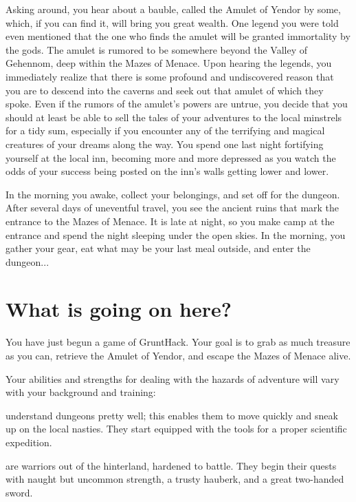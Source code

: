 Asking around, you hear about a bauble, called the Amulet of Yendor by some,
which, if you can find it, will bring you great wealth.  One legend you were
told even mentioned that the one who finds the amulet will be granted
immortality by the gods.  The amulet is rumored to be somewhere beyond the
Valley of Gehennom, deep within the Mazes of Menace.  Upon hearing the
legends, you immediately realize that there is some profound and 
undiscovered reason that you are to descend into the caverns and seek 
out that amulet of which they spoke.  Even if the rumors of the amulet's 
powers are untrue, you decide that you should at least be able to sell the 
tales of your adventures to the local minstrels for a tidy sum, especially 
if you encounter any of the terrifying and magical creatures of 
your dreams along the way.  You spend one last night fortifying yourself 
at the local inn, becoming more and more depressed as you watch the odds 
of your success being posted on the inn's walls getting lower and lower.  


  In the morning you awake, collect your belongings, and 
set off for the dungeon.  After several days of uneventful 
travel, you see the ancient ruins that mark the entrance to the 
Mazes of Menace.  It is late at night, so you make camp at the entrance 
and spend the night sleeping under the open skies.  In the morning, you 
gather your gear, eat what may be your last meal outside, and enter the 
dungeon...

\section{What is going on here?}

You have just begun a game of GruntHack.  Your goal is to grab as much
treasure as you can, retrieve the Amulet of Yendor, and escape the
Mazes of Menace alive.

Your abilities and strengths for dealing with the hazards of adventure
will vary with your background and training:

%
\blist{}
\item[\bb{Archeologists}]%
understand dungeons pretty well; this enables them
to move quickly and sneak up on the local nasties.  They start equipped
with the tools for a proper scientific expedition.

%
\item[\bb{Barbarians}]%
are warriors out of the hinterland, hardened to battle.
They begin their quests with naught but uncommon strength, a trusty hauberk,
and a great two-handed sword.

